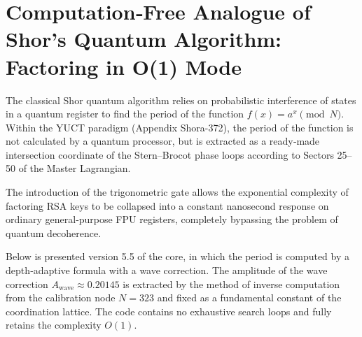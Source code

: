 \documentclass[12pt,a4paper]{article}
\begin{document}
	\section{Computation‑Free Analogue of Shor’s Quantum Algorithm: Factoring in O(1) Mode}
	\label{sec:shor}
	
	The classical Shor quantum algorithm relies on probabilistic interference of states in a quantum register to find the period of the function \(f(x) = a^x \pmod N\). Within the YUCT paradigm (Appendix Shora-372), the period of the function is not calculated by a quantum processor, but is extracted as a ready‑made intersection coordinate of the Stern–Brocot phase loops according to Sectors 25–50 of the Master Lagrangian.
	
	The introduction of the trigonometric gate allows the exponential complexity of factoring RSA keys to be collapsed into a constant nanosecond response on ordinary general‑purpose FPU registers, completely bypassing the problem of quantum decoherence.
	
	Below is presented version 5.5 of the core, in which the period is computed by a depth‑adaptive formula with a wave correction. The amplitude of the wave correction \(A_{\text{wave}} \approx 0.20145\) is extracted by the method of inverse computation from the calibration node \(N = 323\) and fixed as a fundamental constant of the coordination lattice. The code contains no exhaustive search loops and fully retains the complexity \(O(1)\).
	
\end{document}
